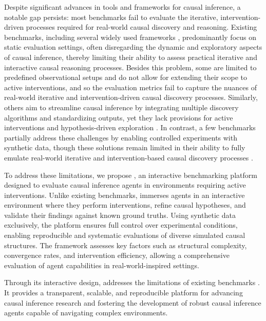 \documentclass{uai2024} %
\begin{document}
    Despite significant advances in tools and frameworks for causal inference, a notable gap persists: most benchmarks fail to evaluate the iterative, intervention-driven processes required for real-world causal discovery and reasoning. 
    Existing benchmarks, including several widely used frameworks \cite{CauseBox2021, ACCBench2024, CIPCaDBench2022}, predominantly focus on static evaluation settings, often disregarding the dynamic and exploratory aspects of causal inference, thereby limiting their ability to assess practical iterative and interactive causal reasoning processes. 
    Besides this problem, some are limited to predefined observational setups and do not allow for extending their scope to active interventions, and so the evaluation metrics fail to capture the nuances of real-world iterative and intervention-driven causal discovery processes. 
    Similarly, others aim to streamline causal inference by integrating multiple discovery algorithms and standardizing outputs, yet they lack provisions for active interventions and hypothesis-driven exploration \cite{ACCBench2024, Framework2021}. 
    In contrast, a few benchmarks partially address these challenges by enabling controlled experiments with synthetic data, though these solutions remain limited in their ability to fully emulate real-world iterative and intervention-based causal discovery processes \cite{runge2019causality, IBM2022}.

    To address these limitations, we propose \game, an interactive benchmarking platform designed to evaluate causal inference agents in environments requiring active interventions. 
    Unlike existing benchmarks, \game immerses agents in an interactive environment where they perform interventions, refine causal hypotheses, and validate their findings against known ground truths.
    Using synthetic data exclusively, the platform ensures full control over experimental conditions, enabling reproducible and systematic evaluations of diverse simulated causal structures. 
    The framework assesses key factors such as structural complexity, convergence rates, and intervention efficiency, allowing a comprehensive evaluation of agent capabilities in real-world-inspired settings.

    Through its interactive design, \game addresses the limitations of existing benchmarks \cite{CausalDiscoveryFramework2024, RealCause2021, BayesianCausalDiscovery2023, CausalBench2024, EvaluationFramework2022, CauseBox2021, PersonalizedExperimentation2022}.
    It provides a transparent, scalable, and reproducible platform for advancing causal inference research and fostering the development of robust causal inference agents capable of navigating complex environments.
\end{document}
